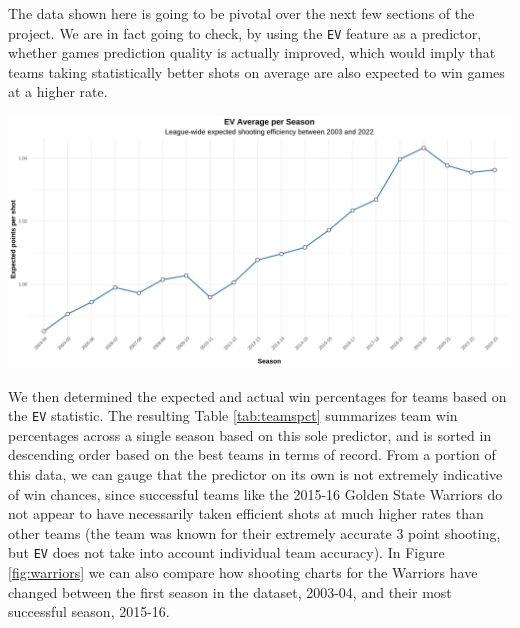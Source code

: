 \documentclass[
  12pt,
  a4paper,
]{article}
\let\origfigure\figure
\let\endorigfigure\endfigure
\renewenvironment{figure}[1][2] {
    \expandafter\origfigure\expandafter[H]
} {
    \endorigfigure
}
\begin{document}
The data shown here is going to be pivotal over the next few sections of the project. We are in fact going to check, by using the \texttt{EV} feature as a predictor, whether games prediction quality is actually improved, which would imply that teams taking statistically better shots on average are also expected to win games at a higher rate.

\begin{figure}

{\centering \includegraphics[width=1\linewidth]{latex/plots/plot_2} 

}

\caption{League-wide expected shooting efficiency between 2003 and 2022}\label{fig:evprog}
\end{figure}

We then determined the expected and actual win percentages for teams based on the \texttt{EV} statistic. The resulting Table \ref{tab:teamspct} summarizes team win percentages across a single season based on this sole predictor, and is sorted in descending order based on the best teams in terms of record. From a portion of this data, we can gauge that the predictor on its own is not extremely indicative of win chances, since successful teams like the 2015-16 Golden State Warriors do not appear to have necessarily taken efficient shots at much higher rates than other teams (the team was known for their extremely accurate 3 point shooting, but \texttt{EV} does not take into account individual team accuracy). In Figure \ref{fig:warriors} we can also compare how shooting charts for the Warriors have changed between the first season in the dataset, 2003-04, and their most successful season, 2015-16.
\end{document}
